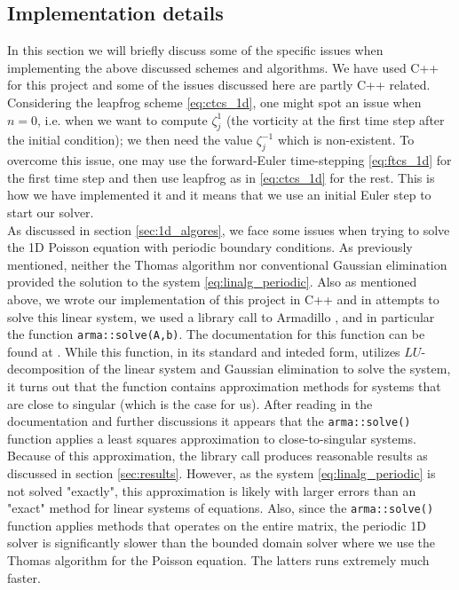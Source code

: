\documentclass[12pt]{article}
\numberwithin{figure}{section}
\numberwithin{table}{section}
\begin{document}
\subsection{Implementation details} \label{sec:implementation_details}
In this section we will briefly discuss some of the specific issues when implementing the above discussed schemes and algorithms. We have used C++ for this project and some of the issues discussed here are partly C++ related. \\

\noindent Considering the leapfrog scheme \eqref{eq:ctcs_1d}, one might spot an issue when $n=0$, i.e. when we want to compute $\zeta_j^{1}$ (the vorticity at the first time step after the initial condition); we then need the value $\zeta_j^{-1}$ which is non-existent. To overcome this issue, one may use the forward-Euler time-stepping \eqref{eq:ftcs_1d} for the first time step and then use leapfrog as in \eqref{eq:ctcs_1d} for the rest. This is how we have implemented it and it means that we use an initial Euler step to start our solver. \\

\noindent As discussed in section \ref{sec:1d_algores}, we face some issues when trying to solve the 1D Poisson equation with periodic boundary conditions. As previously mentioned, neither the Thomas algorithm nor conventional Gaussian elimination provided the solution to the system \eqref{eq:linalg_periodic}. Also as mentioned above, we wrote our implementation of this project in C++ and in attempts to solve this linear system, we used a library call to Armadillo \cite{Arma}, and in particular the function \texttt{arma::solve(A,b)}. The documentation for this function can be found at \cite{arma_doc}. While this function, in its standard and inteded form, utilizes $LU$-decomposition of the linear system and Gaussian elimination to solve the system, it turns out that the function contains approximation methods for systems that are close to singular (which is the case for us). After reading in the documentation and further discussions it appears that the \texttt{arma::solve()} function applies a least squares approximation to close-to-singular systems. Because of this approximation, the library call produces reasonable results as discussed in section \ref{sec:results}. However, as the system \eqref{eq:linalg_periodic} is not solved "exactly", this approximation is likely with larger errors than an "exact" method for linear systems of equations. Also, since the \texttt{arma::solve()} function applies methods that operates on the entire matrix, the periodic 1D solver is significantly slower than the bounded domain solver where we use the Thomas algorithm for the Poisson equation. The latters runs extremely much faster.\\
\end{document}
